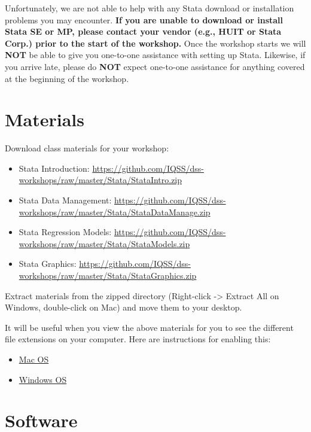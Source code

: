 \documentclass[
]{book}
\providecommand{\tightlist}{%
  \setlength{\itemsep}{0pt}\setlength{\parskip}{0pt}}
\begin{document}
Unfortunately, we are not able to help with any Stata download or installation problems you may encounter. \textbf{If you are unable to download or install Stata SE or MP, please contact your vendor (e.g., HUIT or Stata Corp.) prior to the start of the workshop.} Once the workshop starts we will \textbf{NOT} be able to give you one-to-one assistance with setting up Stata. Likewise, if you arrive late, please do \textbf{NOT} expect one-to-one assistance for anything covered at the beginning of the workshop.

\hypertarget{materials-2}{%
\section{Materials}\label{materials-2}}

Download class materials for your workshop:

\begin{itemize}
\tightlist
\item
  Stata Introduction: \url{https://github.com/IQSS/dss-workshops/raw/master/Stata/StataIntro.zip}
\item
  Stata Data Management: \url{https://github.com/IQSS/dss-workshops/raw/master/Stata/StataDataManage.zip}
\item
  Stata Regression Models: \url{https://github.com/IQSS/dss-workshops/raw/master/Stata/StataModels.zip}
\item
  Stata Graphics: \url{https://github.com/IQSS/dss-workshops/raw/master/Stata/StataGraphics.zip}
\end{itemize}

Extract materials from the zipped directory (Right-click -\textgreater{} Extract All on Windows, double-click on Mac) and move them to your desktop.

It will be useful when you view the above materials for you to see the different file extensions on your computer. Here are instructions for enabling this:

\begin{itemize}
\tightlist
\item
  \href{https://support.apple.com/guide/mac-help/show-or-hide-filename-extensions-on-mac-mchlp2304/mac}{Mac OS}
\item
  \href{http://kb.winzip.com/kb/entry/26/}{Windows OS}
\end{itemize}

\hypertarget{software-2}{%
\section{Software}\label{software-2}}
\end{document}
